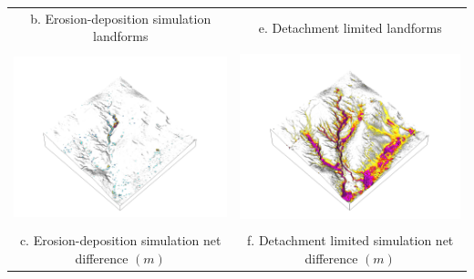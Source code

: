 \documentclass{standalone}
\begin{document}
\begin{tabular}{m{} m{}}
\multicolumn{1}{c}{b. Erosion-deposition simulation landforms}
& \multicolumn{1}{c}{e. Detachment limited landforms}\\
%
\multicolumn{1}{c}{\includegraphics[height=50mm]{../../images/ss_erdep_3d/net_difference.png}} &
\multicolumn{1}{c}{\includegraphics[height=50mm]{../../images/ss_flux_3d/net_difference.png}}\\
\multicolumn{1}{c}{c. Erosion-deposition simulation net difference $(m)$} & \multicolumn{1}{c}{f. Detachment limited simulation net difference $(m)$}\\
%
\end{tabular}

\end{document}
